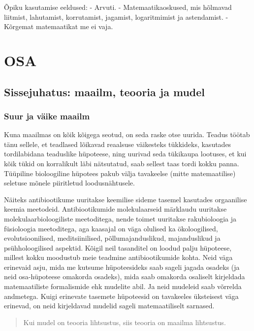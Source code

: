 \documentclass[]{book}
\begin{document}
Õpiku kasutamise eeldused: - Arvuti. - Matemaatikaoskused, mis hõlmavad
liitmist, lahutamist, korrutamist, jagamist, logaritmimist ja
astendamist. - Kõrgemat matemaatikat me ei vaja.

\part{OSA}\label{part-osa}

\chapter{Sissejuhatus: maailm, teooria ja
mudel}\label{sissejuhatus-maailm-teooria-ja-mudel}

\section*{Suur ja väike maailm}\label{suur-ja-vaike-maailm}

Kuna maailmas on kõik kõigega seotud, on seda raske otse uurida. Teadus
töötab tänu sellele, et teadlased lõikavad reaalsuse väikesteks
tükkideks, kasutades tordilabidana teaduslike hüpoteese, ning uurivad
seda tükikaupa lootuses, et kui kõik tükid on korralikult läbi
nätsutatud, saab sellest taas tordi kokku panna. Tüüpiline bioloogiline
hüpotees pakub välja tavakeelse (mitte matemaatilise) seletuse mõnele
piiritletud loodusnähtusele.

Näiteks antibiootikume uuritakse keemilise sideme tasemel kasutades
orgaanilise keemia meetodeid. Antibiootikumide molekulaarseid märklaudu
uuritakse molekulaarbioloogiliste meetoditega, nende toimet uuritakse
rakubioloogia ja füsioloogia meetoditega, aga kaasajal on väga olulised
ka ökoloogilised, evolutsioonilised, meditsiinilised,
põllumajanduslikud, majanduslikud ja psühholoogilised aspektid. Kõigil
neil tasanditel on loodud palju hüpoteese, millest kokku moodustub meie
teadmine antibiootikumide kohta. Neid väga erinevaid asju, mida me
kutsume hüpoteesideks saab sageli jagada osadeks (ja neid osa-hüpoteese
omakorda osadeks), mida saab omakorda osaliselt kirjeldada
matemaatiliste formalismide ehk mudelite abil. Ja neid mudeleid saab
võrrelda andmetega. Kuigi erinevate tasemete hüpoteesid on tavakeeles
üksteisest väga erinevad, on neid kirjeldavad mudelid sageli
matemaatiliselt sarnased.

\begin{quote}
Kui mudel on teooria lihtsustus, siis teooria on maailma lihtsustus.
\end{quote}
\end{document}
